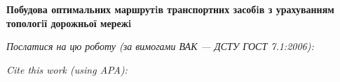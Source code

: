 \documentclass[a4paper,14pt,article]{memoir}
\newcommand{\articleTitleUkr}{
	Побудова оптимальних маршрутiв транспортних засобiв з урахуванням топологiї дорожньої мережi}
\begin{document}
	
	\begin{center}
		\par\textbf{\MakeUppercase\articleTitleUkr}
		\par\textbf{\authorFullNameUkr}
	\end{center}
	
	\par\bigskip\textit{Послатися на цю роботу (за вимогами ВАК --- ДСТУ ГОСТ 7.1:2006):}
	\par{}
	\par\bigskip\textit{Cite this work (using APA):}
	\par{}
	
	
\end{document}
